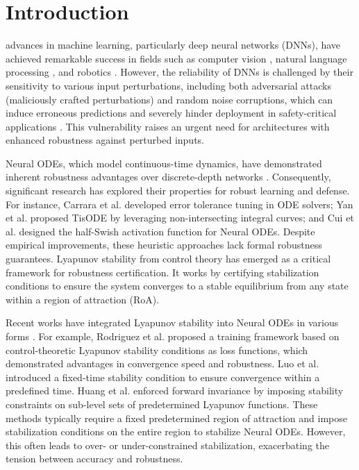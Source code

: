 \documentclass[journal]{IEEEtran}
\begin{document}
\section{Introduction} \label{sec:intro}
 advances in machine learning, particularly deep neural networks (DNNs), have achieved remarkable success in fields such as computer vision \cite{11018619}, natural language processing \cite{10905032}, and robotics \cite{10363393}. However, the reliability of DNNs is challenged by their sensitivity to various input perturbations, including both adversarial attacks (maliciously crafted perturbations) and random noise corruptions, which can induce erroneous predictions and severely hinder deployment in safety-critical applications \cite{10530438,8611298}. This vulnerability raises an urgent need for architectures with enhanced robustness against perturbed inputs.

Neural ODEs, which model continuous-time dynamics, have demonstrated inherent robustness advantages over discrete-depth networks \cite{NEURIPS2018_69386f6b,9157003}. Consequently, significant research has explored their properties for robust learning and defense. For instance, Carrara et al. \cite{9035109} developed error tolerance tuning in ODE solvers; Yan et al. \cite{YAN2020On} proposed TisODE by leveraging non-intersecting integral curves; and Cui et al. \cite{CUI2023576} designed the half-Swish activation function for Neural ODEs.  Despite empirical improvements, these heuristic approaches lack formal robustness guarantees. Lyapunov stability from control theory has emerged as a critical framework for robustness certification.  It works by certifying stabilization conditions to ensure the system converges to a stable equilibrium from any state within a region of attraction (RoA).


Recent works have integrated Lyapunov stability into Neural ODEs in various forms \cite{pmlr-v162-rodriguez22a,huang2022fi,LUO2025107219}. For example, Rodriguez et al. \cite{pmlr-v162-rodriguez22a} proposed a training framework based on control-theoretic Lyapunov stability conditions as loss functions, which demonstrated advantages in convergence speed and robustness. Luo et al. \cite{LUO2025107219} introduced a fixed-time stability condition to ensure convergence within a predefined time. Huang et al. \cite{huang2022fi} enforced forward invariance by imposing stability constraints on sub-level sets of predetermined Lyapunov functions. These methods typically require a fixed predetermined region of attraction and impose stabilization conditions on the entire region to stabilize Neural ODEs. However, this often leads to over- or under-constrained stabilization, exacerbating the tension between accuracy and robustness.
\end{document}
